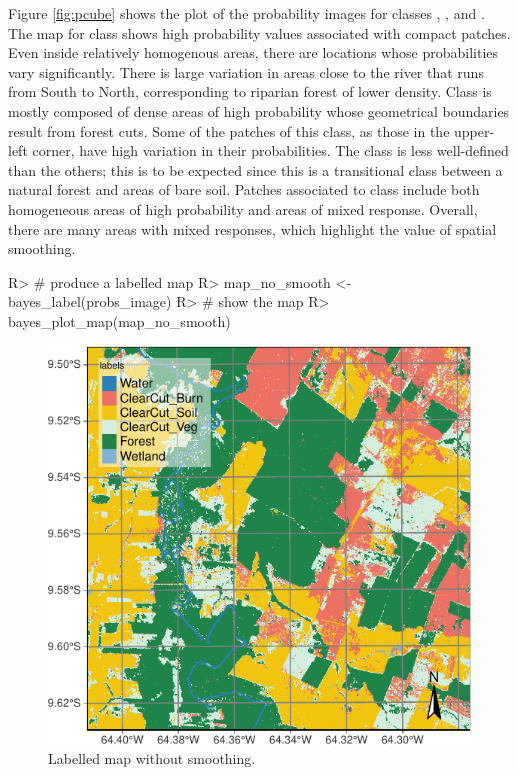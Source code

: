 \documentclass[
  shortnames]{jss}
\begin{document}
Figure \ref{fig:pcube} shows the plot of the probability images for classes , ,  and . The map for class  shows high probability values associated with compact patches. Even inside relatively homogenous areas, there are locations whose probabilities vary significantly. There is large variation in areas close to the river that runs from South to North, corresponding to riparian forest of lower density. Class  is mostly composed of dense areas of high probability whose geometrical boundaries result from forest cuts. Some of the patches of this class, as those in the upper-left corner, have high variation in their probabilities. The class  is less well-defined than the others; this is to be expected since this is a transitional class between a natural forest and areas of bare soil. Patches associated to class  include both homogeneous areas of high probability and areas of mixed response. Overall, there are many areas with mixed responses, which highlight the value of spatial smoothing.

\begin{CodeChunk}
\begin{CodeInput}
R> # produce a labelled map
R> map_no_smooth <- bayes_label(probs_image)
R> # show the map
R> bayes_plot_map(map_no_smooth)
\end{CodeInput}
\begin{figure}[h]

{\centering \includegraphics{Bayesian_smoothing_JSS_files/figure-latex/map1-1} 

}

\caption[Labelled map without smoothing]{Labelled map without smoothing.}\label{fig:map1}
\end{figure}
\end{CodeChunk}
\end{document}
